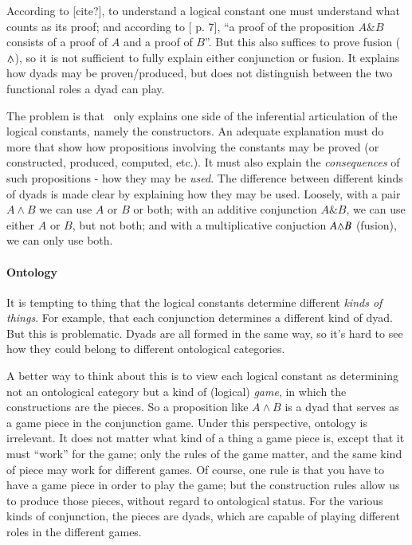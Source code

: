 According to [cite?], to understand a logical constant one must
understand what counts as its proof; and according to
[\parencite{martin1984intuitionistic} p. 7], ``a proof of the proposition
\(A\&B\) consists of a proof of \(A\) and a proof of \(B\)''. But this
also suffices to prove fusion (\(\fusion\)), so it is not sufficient
to fully explain either conjunction or fusion. It explains how dyads
may be proven/produced, but does not distinguish between the two functional
roles a dyad can play.

The problem is that \ML\ only explains one side of the inferential
articulation of the logical constants, namely the constructors. An
adequate explanation must do more that show how propositions involving
the constants may be proved (or constructed, produced, computed,
etc.). It must also explain the \textit{consequences} of such
propositions - how they may be \textit{used}. The difference between
different kinds of dyads is made clear by explaining how they may be
used. Loosely, with a pair \(A\land B\) we can use \(A\) or \(B\) or
both; with an additive conjunction \(A\&B\), we can use either \(A\)
or \(B\), but not both; and with a multiplicative conjuction \(A\fusion
B\) (fusion), we can only use both.

\paragraph{Ontology}

It is tempting to thing that the logical constants determine different
\textit{kinds of things}. For example, that each conjunction
determines a different kind of dyad. But this is problematic. Dyads
are all formed in the same way, so it's hard to see how they could
belong to different ontological categories.

A better way to think about this is to view each logical constant as
determining not an ontological category but a kind of (logical)
\textit{game}, in which the constructions are the pieces. So a
proposition like \(A\land B\) is a dyad that serves as a game piece in
the conjunction game. Under this perspective, ontology is irrelevant.
It does not matter what kind of a thing a game piece is, except that
it must ``work'' for the game; only the rules of the game matter, and
the same kind of piece may work for different games. Of course, one
rule is that you have to have a game piece in order to play the game;
but the construction rules allow us to produce those pieces, without
regard to ontological status. For the various kinds of conjunction,
the pieces are dyads, which are capable of playing different roles in
the different games.

